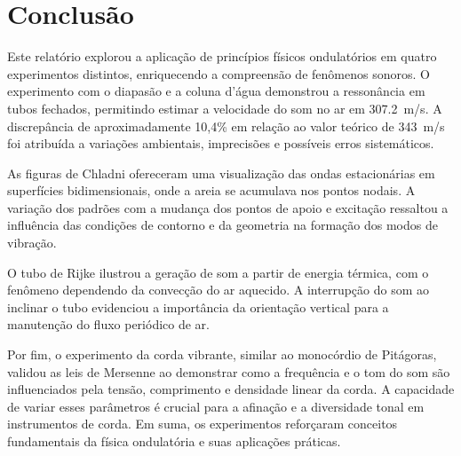 \section{Conclusão} 
Este relatório explorou a aplicação de princípios físicos ondulatórios em quatro experimentos distintos, enriquecendo a compreensão de fenômenos sonoros. O experimento com o diapasão e a coluna d'água demonstrou a ressonância em tubos fechados, permitindo estimar a velocidade do som no ar em \qty{307,2}{m/s}. A discrepância de aproximadamente 10,4\% em relação ao valor teórico de \qty{343}{m/s} foi atribuída a variações ambientais, imprecisões e possíveis erros sistemáticos.

As figuras de Chladni ofereceram uma visualização das ondas estacionárias em superfícies bidimensionais, onde a areia se acumulava nos pontos nodais. A variação dos padrões com a mudança dos pontos de apoio e excitação ressaltou a influência das condições de contorno e da geometria na formação dos modos de vibração.

O tubo de Rijke ilustrou a geração de som a partir de energia térmica, com o fenômeno dependendo da convecção do ar aquecido. A interrupção do som ao inclinar o tubo evidenciou a importância da orientação vertical para a manutenção do fluxo periódico de ar.

Por fim, o experimento da corda vibrante, similar ao monocórdio de Pitágoras, validou as leis de Mersenne ao demonstrar como a frequência e o tom do som são influenciados pela tensão, comprimento e densidade linear da corda. A capacidade de variar esses parâmetros é crucial para a afinação e a diversidade tonal em instrumentos de corda. Em suma, os experimentos reforçaram conceitos fundamentais da física ondulatória e suas aplicações práticas.

